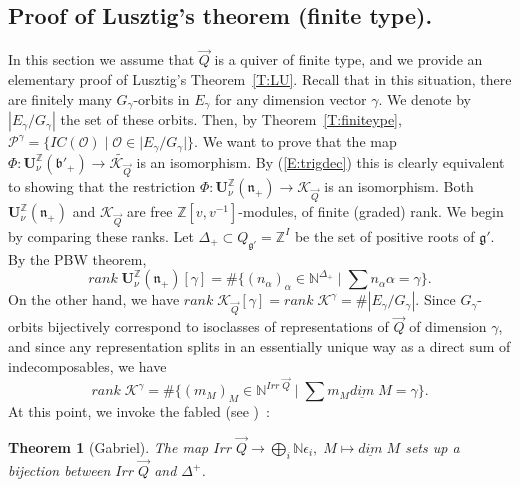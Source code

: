\documentclass[a4paper,10pt]{amsart}
\def\Z{\mathbb{Z}}
\def\U{\mathbf{U}}
\def\N{\mathbb{N}}
\def\a{\alpha}
\def\g{\mathfrak{g}}
\def\bo{\mathfrak{b}}
\def\n{\mathfrak{n}}
\def\KQ{\mathcal{K}_{\vec{Q}}}
\newtheorem{theo}{\bf{Theorem}}[section]
\numberwithin{equation}{section}
\begin{document}
\vspace{.3in}

\subsection{Proof of Lusztig's theorem (finite type).}

\vspace{.15in}

In this section we assume that $\vec{Q}$ is a quiver of finite type, and we provide an elementary proof of Lusztig's Theorem~\ref{T:LU}. Recall that in this situation, there are finitely many $G_{\gamma}$-orbits in $E_{\gamma}$ for any dimension vector $\gamma$. We denote by $|E_{\gamma}/G_{\gamma}|$ the set of these orbits. Then, by Theorem~\ref{T:finiteype}, $\mathcal{P}^{\gamma}=\big\{IC(\mathcal{O})\;|\; \mathcal{O} \in |E_{\gamma}/G_{\gamma}|\big\}$. We want to prove that the map $\Phi: \U^{\Z}_{\nu}(\bo'_+) \to \widetilde{\KQ}$ is an isomorphism. By (\ref{E:trigdec}) this is clearly equivalent to showing that the restriction $\Phi: \U^{\Z}_{\nu}(\n_+) \to {\KQ}$ is an isomorphism. Both $\U^{\Z}_{\nu}(\n_+)$ and ${\KQ}$ are free $\Z[v,v^{-1}]$-modules, of finite (graded) rank. We begin by comparing these ranks. Let $\Delta_+ \subset Q_{\g'}=\Z^I$ be the set of positive roots of $\g'$. By the PBW theorem, 
\begin{equation}\label{E:PBW}
rank\;\U^{\Z}_{\nu}(\n_+)[\gamma]=\# \big\{ (n_{\a})_{\a} \in \N^{\Delta_+}\;|\; \sum n_\a  \a =\gamma \big\}.
\end{equation}
On the other hand, we have $rank\;\mathcal{K}_{\vec{Q}}[\gamma]= rank\;\mathcal{K}^{\gamma}=\# |E_{\gamma}/G_{\gamma}|$. Since $G_{\gamma}$-orbits bijectively correspond to isoclasses of representations of $\vec{Q}$ of dimension $\gamma$, and since any representation splits in an essentially unique way as a direct sum of indecomposables, we have
\begin{equation}\label{E:PBW2}
rank\;\mathcal{K}^\gamma=\# \big\{ (m_{M})_{M} \in \N^{Irr\;\vec{Q}}\;|\; \sum m_M  \underline{dim}\;M =\gamma \big\}.
\end{equation}
At this point, we invoke the fabled (see \cite[Lecture~3]{Trieste})~:

\vspace{.1in}

\begin{theo}[Gabriel] The map $Irr\;\vec{Q} \to \bigoplus_i \N \epsilon_i, \; M \mapsto \underline{dim}\;M$ sets up a bijection between $Irr\;\vec{Q}$ and $\Delta^+$. 
\end{theo}
\end{document}
